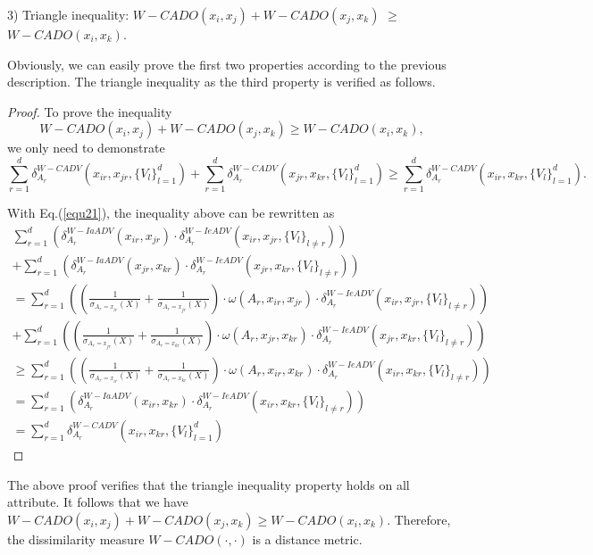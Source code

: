 \documentclass[review]{elsarticle}
\newtheorem{proof}{Proof}
\begin{document}
3) Triangle inequality: $W-CADO(x_i,x_j) + W-CADO(x_j,x_k)$ $\geq$ $W-CADO(x_i,x_k)$.

Obviously, we can easily prove the first two properties according to the previous description. The triangle inequality as the third property is verified as follows.

\begin{proof}
To prove the inequality $$W-CADO(x_i,x_j) + W-CADO(x_j,x_k) \geq W-CADO(x_i,x_k),$$ we only need to demonstrate
$$\sum_{r=1}^{d}\delta_{A_r}^{W-CADV}(x_{ir},x_{jr},\{V_l\}_{l = 1} ^ d)+\sum_{r=1}^{d}\delta_{A_r}^{W-CADV}(x_{jr},x_{kr},\{V_l\}_{l = 1} ^ d) \geq \sum_{r=1}^{d}\delta_{A_r}^{W-CADV}(x_{ir},x_{kr},\{V_l\}_{l = 1} ^ d).$$

With Eq.(\ref{equ21}), the inequality above can be rewritten as
$$\begin{array}{lll}
\sum_{r=1}^{d}(\delta_{A_r}^{W-IaADV}(x_{ir},x_{jr}) \cdot \delta_{A_r}^{W-IeADV}(x_{ir},x_{jr},\{V_l\}_{l \neq r})) \\
+ \sum_{r=1}^{d}(\delta_{A_r}^{W-IaADV}(x_{jr},x_{kr}) \cdot \delta_{A_r}^{W-IeADV}(x_{jr},x_{kr},\{V_l\}_{l \neq r})) \\
= \sum_{r=1}^{d}((\frac{1}{\sigma_{A_r = x_{ir}}(X)} + \frac{1}{\sigma_{A_r = x_{jr}}(X)}) \cdot \omega(A_r,x_{ir},x_{jr}) \cdot \delta_{A_r}^{W-IeADV}(x_{ir},x_{jr},\{V_l\}_{l \neq r})) \\
+ \sum_{r=1}^{d}((\frac{1}{\sigma_{A_r = x_{jr}}(X)} + \frac{1}{\sigma_{A_r = x_{kr}}(X)}) \cdot \omega(A_r,x_{jr},x_{kr}) \cdot \delta_{A_r}^{W-IeADV}(x_{jr},x_{kr},\{V_l\}_{l \neq r})) \\
\geq \sum_{r=1}^{d}((\frac{1}{\sigma_{A_r = x_{ir}}(X)} + \frac{1}{\sigma_{A_r = x_{kr}}(X)}) \cdot \omega(A_r,x_{ir},x_{kr}) \cdot \delta_{A_r}^{W-IeADV}(x_{ir},x_{kr},\{V_l\}_{l \neq r})) \\
= \sum_{r=1}^{d}(\delta_{A_r}^{W-IaADV}(x_{ir},x_{kr}) \cdot \delta_{A_r}^{W-IeADV}(x_{ir},x_{kr},\{V_l\}_{l \neq r})) \\
= \sum_{r=1}^{d}\delta_{A_r}^{W-CADV}(x_{ir},x_{kr},\{V_l\}_{l = 1} ^ d)
\end{array}$$
\end{proof}
The above proof verifies that the triangle inequality property holds on all attribute. It follows that we have $W-CADO(x_i,x_j) + W-CADO(x_j,x_k) \geq W-CADO(x_i,x_k)$. Therefore, the dissimilarity measure $W-CADO(\cdot,\cdot)$ is a distance metric.
\end{document}
